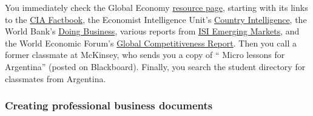 \documentclass[letterpaper,12pt]{article}
\begin{document}
You immediately check the Global Economy 
\href{http://www.stern.nyu.edu/eco/b012303/Backus/ge_resources_db.htm}
{resource page},
starting with its links to the 
\href{https://www.cia.gov/library/publications/the-world-factbook/index.html}
{CIA Factbook}, 
the Economist Intelligence Unit's 
\href{http://db.eiu.com/index.asp?layout=AllTitles}{Country Intelligence},
the World Bank's 
\href{http://www.doingbusiness.org/}
{Doing Business},  
various reports from \href{http://site.securities.com/}{ISI Emerging Markets}, and the World Economic Forum's 
\href{http://www.weforum.org/en/index.htm}
{Global Competitiveness Report}.
Then you call a former classmate at McKinsey,
who sends you a copy of 
``%
{Micro lessons for Argentina}'' (posted on Blackboard).  
Finally, you search the student directory for 
classmates from Argentina.  



\subsubsection*{Creating professional business documents} 
\end{document}
